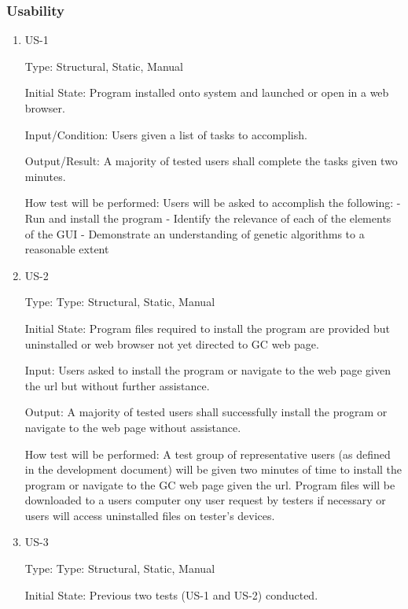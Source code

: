 \documentclass[12pt, titlepage]{article}
\begin{document}
\subsubsection{Usability}

\begin{enumerate}

\item{US-1\\}

Type: Structural, Static, Manual
					
Initial State: Program installed onto system and launched or open in a web 
browser.
					
Input/Condition: Users given a list of tasks to accomplish.
					
Output/Result: A majority of tested users shall complete the tasks given two 
minutes.
					
How test will be performed: Users will be asked to accomplish the following:
- Run and install the program
- Identify the relevance of each of the elements of the GUI
- Demonstrate an understanding of genetic algorithms to a reasonable extent

\item{US-2\\}

Type: Type: Structural, Static, Manual
					
Initial State: Program files required to install the program are provided but 
uninstalled or web browser not yet directed to GC web page.
					
Input: Users asked to install the program or navigate to the web page given the 
url but without further assistance.
					
Output: A majority of tested users shall successfully install the program or 
navigate to the web page without assistance.
					
How test will be performed: A test group of representative users (as defined in 
the development document) will be given two minutes of time to install the 
program or navigate to the GC web page given the url. Program files will be 
downloaded to a users computer ony user request by testers if necessary or users 
will access uninstalled files on tester's devices.

\item{US-3\\}

Type: Type: Structural, Static, Manual
					
Initial State: Previous two tests (US-1 and US-2) conducted.
					

\end{enumerate}
\end{document}
